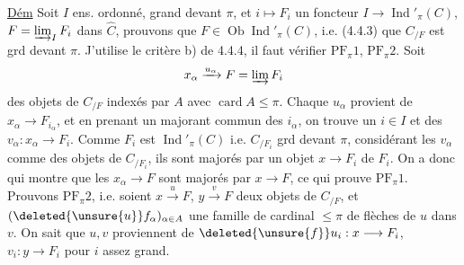 \uline{Dém} Soit $I$ ens. ordonné, grand devant $\pi$, et  $i\longmapsto F_i$ un foncteur $I\to\operatorname{Ind}'_\pi(C)$, $F=\varinjlim_I F_i$ dans $\widehat C$, prouvons que $F\in\operatorname{Ob}\operatorname{Ind}'_\pi(C)$, i.e. (4.4.3) que $C_{/F}$ est grd devant $\pi$. J'utilise le critère b) de 4.4.4, il faut vérifier $\mathrm{PF}_{\pi}1$, $\mathrm{PF}_{\pi}2$. Soit
\[
x_\alpha\xrightarrow{u_\alpha}F=\varinjlim F_i
\]
des objets de $C_{/F}$ indexés par $A$ avec $\operatorname{card} A\leq\pi$. Chaque $u_\alpha$ provient de $x_\alpha\to F_{i_\alpha}$, et en prenant un majorant commun des $i_\alpha$,  on trouve un $i\in I$ et des $v_\alpha:x_\alpha\to F_i$. Comme $F_i$ est  $\operatorname{Ind}'_\pi(C)$ i.e. $C_{/F_i}$ grd devant $\pi$, considérant les $v_\alpha$ comme des objets de $C_{/F_i}$, ils sont majorés par un objet $x\longrightarrow F_i$ de $F_i$. On a donc
qui montre que les $x_\alpha\longrightarrow F$ sont majorés par $x\to F$,
ce qui prouve $\mathrm{PF}_\pi1$. Prouvons $\mathrm{PF}_\pi2$, i.e. soient $x\xrightarrow{u}F$, $y\xrightarrow{v}F$ deux objets de $C_{/F}$, et $(\deleted{\unsure{u}}f_\alpha)_{\alpha\in A}$ une famille de cardinal $\leq\pi$ de flèches de $u$ dans $v$.
On sait que $u,v$ proviennent de $\deleted{\unsure{f}}u_i:x\longrightarrow F_i$, $v_i:y\longrightarrow F_i$ pour $i$ assez grand.
